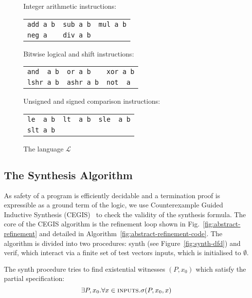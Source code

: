 \begin{figure}
{\small
\begin{center}
\setlength{\tabcolsep}{16pt}
Integer arithmetic instructions:

\begin{tabular}{lll}
 \verb|add a b| & \verb|sub a b| & \verb|mul a b| \\
 \verb|neg a| & \verb|div a b|  & 
\end{tabular}

\medskip

Bitwise logical and shift instructions:

\begin{tabular}{lll}
 \verb|and  a b| & \verb|or a b| & \verb|xor a b| \\
 \verb|lshr a b| & \verb|ashr a b| & \verb|not  a| 
\end{tabular}

\medskip

Unsigned and signed comparison instructions:

\begin{tabular}{lll}
 \verb|le  a b| & \verb|lt  a b| & \verb|sle  a b| \\
 \verb|slt a b| & &
\end{tabular}
\end{center}
}
 \caption{The language $\mathcal{L}$}
 \label{fig:l-language}
\end{figure}


\subsection{The Synthesis Algorithm}
As safety of a \newC program is efficiently 
decidable and a termination proof is expressible as a ground term of the \newC logic, we use
Counterexample Guided Inductive Synthesis (CEGIS)~\cite{lezama-thesis,sketch} to
check the validity of the synthesis formula. 
The core of the CEGIS algorithm is the refinement loop shown in Fig.~\ref{fig:abstract-refinement} and
detailed in Algorithm~\ref{fig:abstract-refinement-code}.  
The algorithm is divided into two
procedures: {\sc synth} (see Figure~\ref{fig:synth-dfd}) and {\sc verif}, which interact via
a finite set of test vectors {\sc inputs}, which is initialised to $\emptyset$.

The {\sc synth} procedure tries to find existential witnesses $(P, x_0)$ which satisfy the partial specification:
\[
 \exists P, x_0 . \forall x \in \text{\sc inputs} . \sigma(P, x_0, x)
\]

